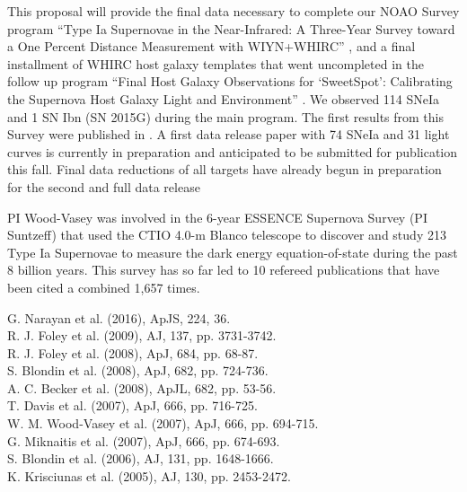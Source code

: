 \documentclass[11pt]{article}
\begin{document}
%

\thepast

This proposal will provide the final data necessary to complete our NOAO Survey 
program ``Type Ia Supernovae in the Near-Infrared: A Three-Year Survey toward a One Percent Distance Measurement with WIYN+WHIRC'' ,
and a final installment of WHIRC host galaxy templates that went uncompleted in the follow up program
``Final Host Galaxy Observations for `SweetSpot': Calibrating the Supernova Host Galaxy Light and Environment''
.
We observed 114 SNeIa and 1 SN Ibn (SN 2015G) during the main program.
The first results from this Survey were published in \cite{weyant11}.  
A first data release paper with 74 SNeIa and 31 light curves is currently in preparation and anticipated to be submitted for publication this fall.
Final data reductions of all targets have already begun in preparation for the second and full data release

PI Wood-Vasey was involved in the 6-year ESSENCE Supernova Survey (PI Suntzeff) that used the CTIO 4.0-m Blanco telescope to discover and study 213 Type Ia Supernovae to measure the dark energy equation-of-state during the past 8 billion years.  This survey has so far led to 10 refereed publications that have been cited a combined 1,657 times.

G. Narayan et al. (2016), ApJS, 224, 36.  \\  %
R. J. Foley et al. (2009), AJ, 137, pp. 3731-3742.  \\  %
R. J. Foley et al. (2008), ApJ, 684, pp. 68-87.  \\  %
S. Blondin et al. (2008), ApJ, 682, pp. 724-736.  \\  %
A. C. Becker et al. (2008), ApJL, 682, pp. 53-56. \\  %
T. Davis et al. (2007), ApJ, 666, pp. 716-725.  \\  %
W. M. Wood-Vasey et al. (2007), ApJ, 666, pp. 694-715. \\  %
G. Miknaitis et al. (2007), ApJ, 666, pp. 674-693. \\  %
S. Blondin et al. (2006), AJ, 131, pp. 1648-1666. \\  %
K. Krisciunas et al. (2005), AJ, 130, pp. 2453-2472. \\  %
\end{document}
